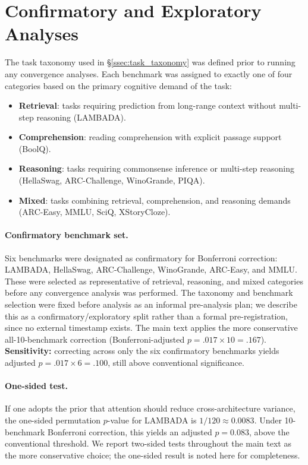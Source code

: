 
\section{Confirmatory and Exploratory Analyses}\label{app:benchmark_details}

The task taxonomy used in \S\ref{ssec:task_taxonomy} was defined prior to running any convergence analyses. Each benchmark was assigned to exactly one of four categories based on the primary cognitive demand of the task:

\begin{itemize}
    \item \textbf{Retrieval}: tasks requiring prediction from long-range context without multi-step reasoning (LAMBADA).
    \item \textbf{Comprehension}: reading comprehension with explicit passage support (BoolQ).
    \item \textbf{Reasoning}: tasks requiring commonsense inference or multi-step reasoning (HellaSwag, ARC-Challenge, WinoGrande, PIQA).
    \item \textbf{Mixed}: tasks combining retrieval, comprehension, and reasoning demands (ARC-Easy, MMLU, SciQ, XStoryCloze).
\end{itemize}

\paragraph{Confirmatory benchmark set.} Six benchmarks were designated as confirmatory for Bonferroni correction: LAMBADA, HellaSwag, ARC-Challenge, WinoGrande, ARC-Easy, and MMLU. These were selected as representative of retrieval, reasoning, and mixed categories before any convergence analysis was performed. The taxonomy and benchmark selection were fixed before analysis as an informal pre-analysis plan; we describe this as a confirmatory/exploratory split rather than a formal pre-registration, since no external timestamp exists. The main text applies the more conservative all-10-benchmark correction (Bonferroni-adjusted $p = .017 \times 10 = .167$). \textbf{Sensitivity:} correcting across only the six confirmatory benchmarks yields adjusted $p = .017 \times 6 = .100$, still above conventional significance.

\paragraph{One-sided test.} If one adopts the prior that attention should reduce cross-architecture variance, the one-sided permutation $p$-value for LAMBADA is $1/120 \approx 0.0083$. Under 10-benchmark Bonferroni correction, this yields an adjusted $p = 0.083$, above the conventional threshold. We report two-sided tests throughout the main text as the more conservative choice; the one-sided result is noted here for completeness.

